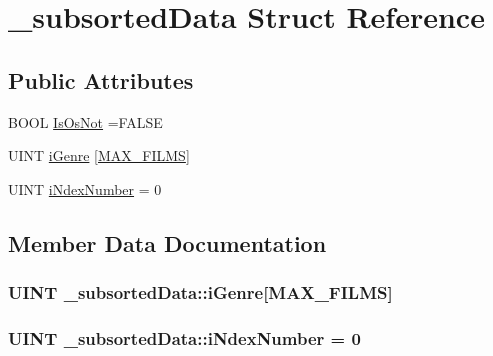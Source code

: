 \hypertarget{struct__subsorted_data}{}\section{\+\_\+subsorted\+Data Struct Reference}
\label{struct__subsorted_data}
\subsection*{Public Attributes}
\begin{DoxyCompactItemize}
\item 
B\+O\+O\+L \hyperlink{struct__subsorted_data_a0862da3adfbf1c8f7c5fb7fb746f2616}{Is\+Os\+Not} =F\+A\+L\+S\+E
\item 
U\+I\+N\+T \hyperlink{struct__subsorted_data_a76958839fb96362314828bb26d261c5e}{i\+Genre} \mbox{[}\hyperlink{_b_o_w-a_01film_01guessing_01game_8cpp_aa31048f49d109f6551271267f3470d11}{M\+A\+X\+\_\+\+F\+I\+L\+M\+S}\mbox{]}
\item 
U\+I\+N\+T \hyperlink{struct__subsorted_data_a148bf7c6d956a3a56b185f53a8884ed3}{i\+Ndex\+Number} = 0
\end{DoxyCompactItemize}


\subsection{Member Data Documentation}
\hypertarget{struct__subsorted_data_a76958839fb96362314828bb26d261c5e}{}
\subsubsection[{i\+Genre}]{\setlength{\rightskip}{0pt plus 5cm}U\+I\+N\+T \+\_\+subsorted\+Data\+::i\+Genre\mbox{[}{\bf M\+A\+X\+\_\+\+F\+I\+L\+M\+S}\mbox{]}}\label{struct__subsorted_data_a76958839fb96362314828bb26d261c5e}
\hypertarget{struct__subsorted_data_a148bf7c6d956a3a56b185f53a8884ed3}{}
\subsubsection[{i\+Ndex\+Number}]{\setlength{\rightskip}{0pt plus 5cm}U\+I\+N\+T \+\_\+subsorted\+Data\+::i\+Ndex\+Number = 0}\label{struct__subsorted_data_a148bf7c6d956a3a56b185f53a8884ed3}
\hypertarget{struct__subsorted_data_a0862da3adfbf1c8f7c5fb7fb746f2616}{}
